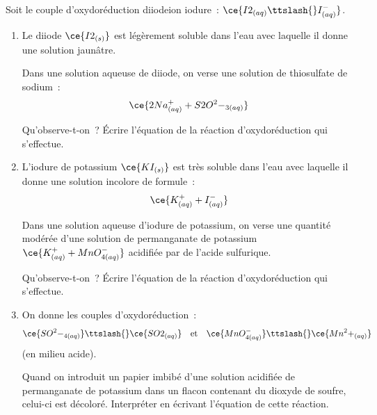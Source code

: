 Soit le couple d'oxydoréduction diiode\ttslash{}ion iodure~:
$\ce{I2_{(aq)}\ttslash{}I^-_{(aq)}}$.
\begin{enumerate}
    \item Le diiode $\ce{I2_{(s)}}$ est légèrement soluble dans l'eau avec
          laquelle il donne une solution jaunâtre.
    
          Dans une solution aqueuse de diiode, on verse une solution de
          thiosulfate de sodium~:
          \[
              \ce{2 Na^+_{(aq)} + S2O^2-_{3(aq)}}
          \]

          Qu'observe-t-on~? Écrire l'équation de la réaction d'oxydoréduction
          qui s'effectue.
    \item L'iodure de potassium $\ce{KI_{(s)}}$ est très soluble dans l'eau avec
          laquelle il donne une solution incolore de formule~:
          \[
              \ce{K^+_{(aq)} + I^-_{(aq)}}
          \]

          Dans une solution aqueuse d'iodure de potassium, on verse une quantité
          modérée d'une solution de permanganate de potassium
          $\ce{K^+_{(aq)} + MnO^-_{4(aq)}}$ acidifiée par de l'acide
          sulfurique.
    
          Qu'observe-t-on~? Écrire l'équation de la réaction d'oxydoréduction
          qui s'effectue.
    \item On donne les couples d'oxydoréduction~:
          \[
              \ce{SO^2-_{4(aq)}}\ttslash{}\ce{SO2_{(aq)}}
              \quad\text{et}\quad
              \ce{MnO^-_{4(aq)}}\ttslash{}\ce{Mn^2+_{(aq)}}
          \]
          (en milieu acide).

          Quand on introduit un papier imbibé d'une solution acidifiée de
          permanganate de potassium dans un flacon contenant du dioxyde de
          soufre, celui-ci est décoloré. Interpréter en écrivant l'équation de
          cette réaction.
\end{enumerate}

